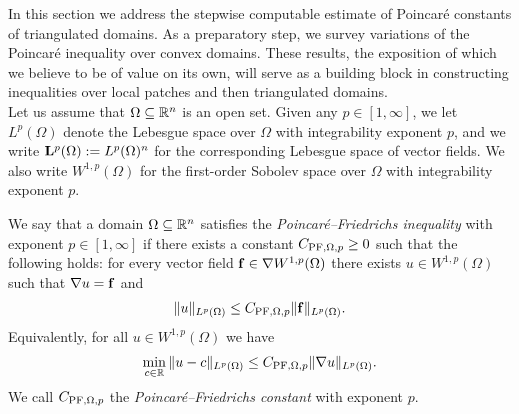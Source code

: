 \documentclass[a4paper]{article}
\begin{document}
In this section we address the stepwise computable estimate of Poincar\'e constants of triangulated domains. As a preparatory step, we survey variations of the Poincar\'e inequality over convex domains. These results, the exposition of which we believe to be of value on its own, will serve as a building block in constructing inequalities over local patches and then triangulated domains.
\\

Let us assume that $\Omega \subseteq {\mathbb R}^{n}$ is an open set. 
Given any $p \in [1,\infty]$, we let $L^p(\Omega)$ denote the Lebesgue space over $\Omega$ with integrability exponent $p$, and we write ${\mathbf L}^p(\Omega) := L^p(\Omega)^{n}$ for the corresponding Lebesgue space of vector fields. 
We also write $W^{1,p}(\Omega)$ for the first-order Sobolev space over $\Omega$ with integrability exponent $p$. 

We say that a domain $\Omega \subseteq {\mathbb R}^{n}$ satisfies the \emph{Poincar\'e--Friedrichs inequality} with exponent $p \in [1,\infty]$
if there exists a constant $C_{{\rm PF},\Omega,p} \geq 0$ such that the following holds:
for every vector field ${\mathbf f} \in \nabla W^{1,p}(\Omega)$ there exists $u \in W^{1,p}(\Omega)$
such that $\nabla u = {\mathbf f}$ and 
\begin{align}\label{math:inequalitypf:gradient}
    \| u \|_{L^{p}(\Omega)}
    \leq 
    C_{{\rm PF},\Omega,p} 
    \| {\mathbf f} \|_{L^{p}(\Omega)}
    .
\end{align}
Equivalently, for all $u \in W^{1,p}(\Omega)$ we have 
\begin{align}
    \min_{ c \in {\mathbb R} } \| u - c \|_{L^{p}(\Omega)}
    \leq 
    C_{{\rm PF},\Omega,p} 
    \| \nabla u \|_{L^{p}(\Omega)}
    .
\end{align}
We call $C_{{\rm PF},\Omega,p}$ the \emph{Poincar\'e--Friedrichs constant} with exponent $p$. 
\end{document}
